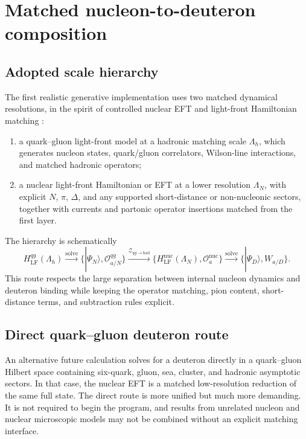 \documentclass[11pt]{article}
\newcommand{\LF}{\mathrm{LF}}
\newcommand{\cO}{\mathcal O}
\newcommand{\cZ}{\mathcal Z}
\begin{document}
\section{Matched nucleon-to-deuteron composition}
\label{sec:nuclear-composition}

\subsection{Adopted scale hierarchy}

The first realistic generative implementation uses two matched dynamical
resolutions, in the spirit of controlled nuclear EFT and light-front Hamiltonian matching \cite{Epelbaum2009,Cao2026}:
\begin{enumerate}
\item a quark--gluon light-front model at a hadronic matching scale
\(\Lambda_h\), which generates nucleon states, quark/gluon correlators,
Wilson-line interactions, and matched hadronic operators;
\item a nuclear light-front Hamiltonian or EFT at a lower resolution
\(\Lambda_N\), with explicit \(N\), \(\pi\), \(\Delta\), and any supported
short-distance or non-nucleonic sectors, together with currents and partonic
operator insertions matched from the first layer.
\end{enumerate}
The hierarchy is schematically
\begin{equation}
 H_{\LF}^{qg}(\Lambda_h)
 \xrightarrow{\text{solve}}
 \{|\Psi_N\rangle,\cO_{a/N}^{qg}\}
 \xrightarrow{\cZ_{qg\to\mathrm{had}}}
 \{H_{\LF}^{\mathrm{nuc}}(\Lambda_N),
 \cO_{a}^{\mathrm{nuc}}\}
 \xrightarrow{\text{solve}}
 \{|\Psi_D\rangle,W_{a/D}\}.
\label{eq:hierarchical-nuclear-route}
\end{equation}
This route respects the large separation between internal nucleon dynamics
and deuteron binding while keeping the operator matching, pion content,
short-distance terms, and subtraction rules explicit.

\subsection{Direct quark--gluon deuteron route}

An alternative future calculation solves for a deuteron directly in a
quark--gluon Hilbert space containing six-quark, gluon, sea, cluster, and
hadronic asymptotic sectors.  In that case, the nuclear EFT is a matched
low-resolution reduction of the same full state.  The direct route is more
unified but much more demanding.  It is not required to begin the program,
and results from unrelated nucleon and nuclear microscopic models may not be
combined without an explicit matching interface.
\end{document}
